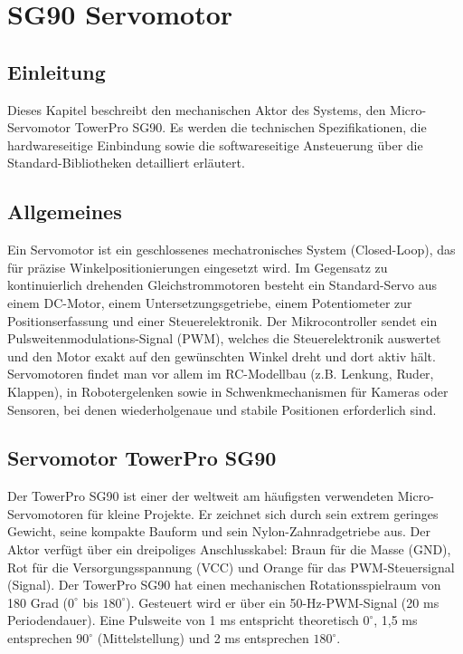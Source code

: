 %
%

\chapter{SG90 Servomotor}

\section*{Einleitung}
Dieses Kapitel beschreibt den mechanischen Aktor des Systems, den Micro-Servomotor TowerPro SG90. Es werden die technischen Spezifikationen, die hardwareseitige Einbindung sowie die softwareseitige Ansteuerung über die Standard-Bibliotheken detailliert erläutert.


\section{Allgemeines}
Ein Servomotor ist ein geschlossenes mechatronisches System (Closed-Loop), das für präzise Winkelpositionierungen eingesetzt wird. Im Gegensatz zu kontinuierlich drehenden Gleichstrommotoren besteht ein Standard-Servo aus einem DC-Motor, einem Untersetzungsgetriebe, einem Potentiometer zur Positionserfassung und einer Steuerelektronik. Der Mikrocontroller sendet ein Pulsweitenmodulations-Signal (PWM), welches die Steuerelektronik auswertet und den Motor exakt auf den gewünschten Winkel dreht und dort aktiv hält. Servomotoren findet man vor allem im RC-Modellbau (z.B. Lenkung, Ruder, Klappen), in Robotergelenken sowie in Schwenkmechanismen für Kameras oder Sensoren, bei denen wiederholgenaue und stabile Positionen erforderlich sind.\cite{SparkFun:2026}

\section{Servomotor TowerPro SG90}
Der TowerPro SG90 ist einer der weltweit am häufigsten verwendeten Micro-Servomotoren für kleine Projekte. Er zeichnet sich durch sein extrem geringes Gewicht, seine kompakte Bauform und sein Nylon-Zahnradgetriebe aus. Der Aktor verfügt über ein dreipoliges Anschlusskabel: Braun für die Masse (GND), Rot für die Versorgungsspannung (VCC) und Orange für das PWM-Steuersignal (Signal). Der TowerPro SG90 hat einen mechanischen Rotationsspielraum von 180 Grad ($0^\circ$ bis $180^\circ$). Gesteuert wird er über ein 50-Hz-PWM-Signal (20 ms Periodendauer). Eine Pulsweite von 1 ms entspricht theoretisch $0^\circ$, 1,5 ms entsprechen $90^\circ$ (Mittelstellung) und 2 ms entsprechen $180^\circ$.\cite{Elektronik:2026,Components101:2017}  

